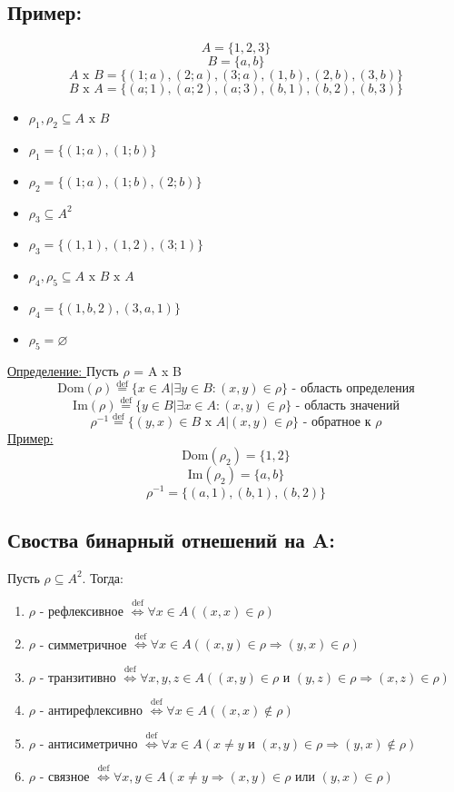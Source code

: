 \documentclass[12pt]{article}
\begin{document}
    \subsection*{Пример:}
    \[A=\{1,2,3\}\]
    \[B=\{a,b\}\]
    \[A \text{ x } B = \{(1;a),(2;a),(3;a),(1,b),(2,b),(3,b)\}\]
    \[B \text{ x } A = \{(a;1),(a;2),(a;3),(b,1),(b,2),(b,3)\}\]
    \begin{itemize}
        \item $\rho_1,\rho_2 \subseteq A \text{ x } B$
        \item $\rho_1 = \{(1;a),(1;b)\}$
        \item $\rho_2 = \{(1;a),(1;b),(2;b)\}$
        \item $\rho_3 \subseteq A^2$
        \item $\rho_3 = \{(1,1),(1,2),(3;1)\}$
        \item $\rho_4,\rho_5 \subseteq A \text{ x } B \text{ x } A$
        \item $\rho_4 = \{(1,b,2),(3,a,1)\}$
        \item $\rho_5 = \varnothing$
    \end{itemize}
    \underline{Определение: } Пусть $\rho$ = A x B
    \[\text{Dom}(\rho)\overset{\text{def}}{=}\{x \in A | \exists y \in B:(x,y) \in \rho\} \text{ - область определения}\]
    \[\text{Im}(\rho)\overset{\text{def}}{=}\{y \in B | \exists x \in A:(x,y)\in \rho\} \text{ - область значений}\]
    \[\rho^{-1}\overset{\text{def}}{=} \{(y,x)\in B \text{ x } A | (x,y)\in \rho\} \text{ - обратное к } \rho\]
    \underline{Пример:} 
    \[\text{Dom}(\rho_2)=\{1,2\}\]
    \[\text{Im}(\rho_2)=\{a,b\}\]
    \[\rho^{-1}=\{(a,1),(b,1),(b,2)\}\]
    \subsection*{Своства бинарный отнешений на A:}
    Пусть $\rho \subseteq A^2$. Тогда:
    \begin{enumerate}
        \item $\rho$ - рефлексивное $\overset{\text{def}}{\Leftrightarrow} \forall x \in A ((x,x)\in \rho)$
        \item $\rho$ - симметричное $\overset{\text{def}}{\Leftrightarrow} \forall x \in A ((x,y)\in \rho \Rightarrow (y,x) \in \rho)$
        \item $\rho$ - транзитивно $\overset{\text{def}}{\Leftrightarrow} \forall x,y,z \in A ((x,y)\in \rho \text{ и } (y,z)\in \rho
        \Rightarrow (x,z) \in \rho)$
        \item $\rho$ - антирефлексивно $\overset{\text{def}}{\Leftrightarrow} \forall x \in A ((x,x) \not \in \rho)$
        \item $\rho$ - антисиметрично $\overset{\text{def}}{\Leftrightarrow} \forall x \in A (x \not = y \text{ и } (x,y) \in \rho
        \Rightarrow (y,x)\not \in \rho)$
        \item $\rho$ - связное $\overset{\text{def}}{\Leftrightarrow}\forall x,y \in A (x \not = y \Rightarrow (x,y)\in \rho \text{ или }
        (y,x)\in \rho)$
    \end{enumerate}
\end{document}
